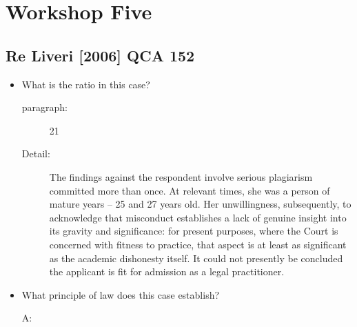 \section*{Workshop Five}
\date{April 9th 2024}

\subsection*{Re Liveri [2006] QCA 152}

\begin{itemize}
    \item What is the ratio in this case?
        \begin{description}
            \item[paragraph:]21
            \item[Detail:]The findings against the respondent involve serious plagiarism committed more than once. At relevant times, she was a person of mature years – 25 and 27 years old. Her unwillingness, subsequently, to acknowledge that misconduct establishes a lack of genuine insight into its gravity and significance: for present purposes, where the Court is concerned with fitness to practice, that aspect is at least as significant as the academic dishonesty itself. It could not presently be concluded the applicant is fit for admission as a legal practitioner.
        \end{description}
        
    \item What principle of law does this case establish?
        \begin{description}
            \item[A:]
        \end{description}
\end{itemize}

